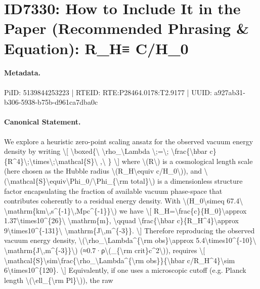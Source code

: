 \section*{ID7330: How to Include It in the Paper (Recommended Phrasing \& Equation): R\_H≡ C/H\_0}
\paragraph{Metadata.}
PiID: 5139844253223 | RTEID: RTE:P28464.0178:T2.9177 | UUID: a927ab31-b306-5938-b75b-d961ca7dba0c

\paragraph{Canonical Statement.}
We explore a heuristic zero-point scaling ansatz for the observed vacuum energy density by writing \textbackslash{}[ \textbackslash{}boxed\{\textbackslash{} \textbackslash{}rho\_\textbackslash{}Lambda \textbackslash{};=\textbackslash{}; \textbackslash{}frac\{\textbackslash{}hbar c\}\{R\textasciicircum{}4\}\textbackslash{};\textbackslash{}times\textbackslash{};\textbackslash{}mathcal\{S\}\textbackslash{} ,\textbackslash{} \} \textbackslash{}] where \textbackslash{}(R\textbackslash{}) is a cosmological length scale (here chosen as the Hubble radius \textbackslash{}(R\_H\textbackslash{}equiv c/H\_0\textbackslash{})), and \textbackslash{}(\textbackslash{}mathcal\{S\}\textbackslash{}equiv\textbackslash{}Phi\_0/\textbackslash{}Phi\_\{\textbackslash{}rm total\}\textbackslash{}) is a dimensionless structure factor encapsulating the fraction of available vacuum phase-space that contributes coherently to a residual energy density. With \textbackslash{}(H\_0\textbackslash{}simeq 67.4\textbackslash{} \textbackslash{}mathrm\{km\textbackslash{},s\textasciicircum{}\{-1\}\textbackslash{},Mpc\textasciicircum{}\{-1\}\}\textbackslash{}) we have \textbackslash{}[ R\_H=\textbackslash{}frac\{c\}\{H\_0\}\textbackslash{}approx 1.37\textbackslash{}times10\textasciicircum{}\{26\}\textbackslash{} \textbackslash{}mathrm\{m\}, \textbackslash{}qquad \textbackslash{}frac\{\textbackslash{}hbar c\}\{R\_H\textasciicircum{}4\}\textbackslash{}approx 9\textbackslash{}times10\textasciicircum{}\{-131\}\textbackslash{} \textbackslash{}mathrm\{J\textbackslash{},m\textasciicircum{}\{-3\}\}. \textbackslash{}] Therefore reproducing the observed vacuum energy density, \textbackslash{}(\textbackslash{}rho\_\textbackslash{}Lambda\textasciicircum{}\{\textbackslash{}rm obs\}\textbackslash{}approx 5.4\textbackslash{}times10\textasciicircum{}\{-10\}\textbackslash{} \textbackslash{}mathrm\{J\textbackslash{},m\textasciicircum{}\{-3\}\}\textbackslash{}) (≈0.7·ρ\textbackslash{}(\_\{\textbackslash{}rm crit\}c\textasciicircum{}2\textbackslash{})), requires \textbackslash{}[ \textbackslash{}mathcal\{S\}\textbackslash{}sim\textbackslash{}frac\{\textbackslash{}rho\_\textbackslash{}Lambda\textasciicircum{}\{\textbackslash{}rm obs\}\}\{\textbackslash{}hbar c/R\_H\textasciicircum{}4\}\textbackslash{}sim 6\textbackslash{}times10\textasciicircum{}\{120\}. \textbackslash{}] Equivalently, if one uses a microscopic cutoff (e.g. Planck length \textbackslash{}(\textbackslash{}ell\_\{\textbackslash{}rm Pl\}\textbackslash{})), the raw 